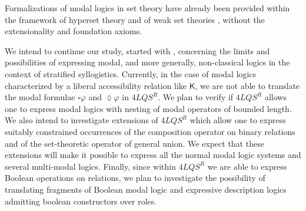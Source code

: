 \documentclass{fundam}
\newcommand{\K}{\mathsf{K}}
\newcommand{\QLQSR}{\ensuremath{\mbox{$4\mathit{LQS}^{R}$}}\xspace}
\begin{document}
Formalizations of modal logics in set theory have already been
provided within the framework of hyperset theory \cite{BaMo96} and of
weak set theories \cite{DMP95}, without the extensionality and
foundation axioms.

We intend to continue our study, started with \cite{CanNic08},
concerning the limits and possibilities of expressing modal, and
more generally, non-classical logics in the context of stratified
syllogistics.  Currently, in the case of modal logics characterized by
a liberal accessibility relation like $\K$, we are not able to
translate the modal formulae $\square \varphi$ and $\lozenge \varphi$
in $\QLQSR$. We plan to verify if $\QLQSR$ allows one to express modal logics with nesting of modal operators of bounded length.
We also intend to investigate extensions of $\QLQSR$ which
allow one to express suitably constrained occurrences of the
composition operator on binary relations and of the set-theoretic
operator of general union. We expect that these extensions will make it possible to express
all the normal modal logic systems and several multi-modal logics.
Finally, since within $\QLQSR$ we are able to express Boolean
operations on relations, we plan to investigate the possibility of
translating fragments of Boolean modal logic and expressive description logics
admitting boolean constructors over roles.
\end{document}
